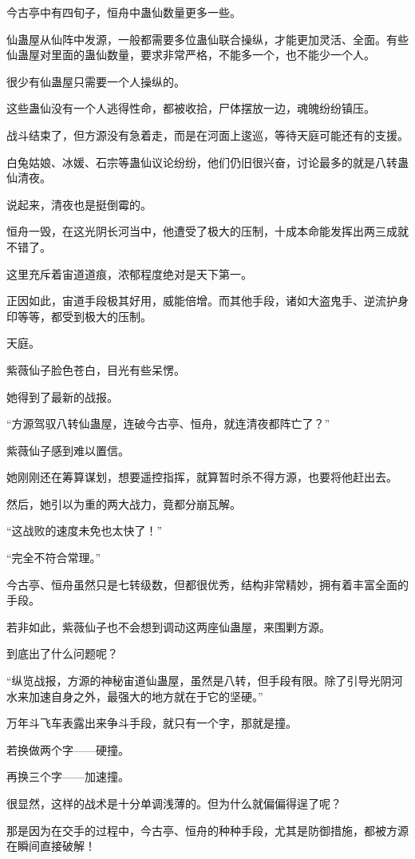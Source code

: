 \begin{this_body}
今古亭中有四旬子，恒舟中蛊仙数量更多一些。

仙蛊屋从仙阵中发源，一般都需要多位蛊仙联合操纵，才能更加灵活、全面。有些仙蛊屋对里面的蛊仙数量，要求非常严格，不能多一个，也不能少一个人。

很少有仙蛊屋只需要一个人操纵的。

这些蛊仙没有一个人逃得性命，都被收拾，尸体摆放一边，魂魄纷纷镇压。

战斗结束了，但方源没有急着走，而是在河面上逡巡，等待天庭可能还有的支援。

白兔姑娘、冰媛、石宗等蛊仙议论纷纷，他们仍旧很兴奋，讨论最多的就是八转蛊仙清夜。

说起来，清夜也是挺倒霉的。

恒舟一毁，在这光阴长河当中，他遭受了极大的压制，十成本命能发挥出两三成就不错了。

这里充斥着宙道道痕，浓郁程度绝对是天下第一。

正因如此，宙道手段极其好用，威能倍增。而其他手段，诸如大盗鬼手、逆流护身印等等，都受到极大的压制。

天庭。

紫薇仙子脸色苍白，目光有些呆愣。

她得到了最新的战报。

“方源驾驭八转仙蛊屋，连破今古亭、恒舟，就连清夜都阵亡了？”

紫薇仙子感到难以置信。

她刚刚还在筹算谋划，想要遥控指挥，就算暂时杀不得方源，也要将他赶出去。

然后，她引以为重的两大战力，竟都分崩瓦解。

“这战败的速度未免也太快了！”

“完全不符合常理。”

今古亭、恒舟虽然只是七转级数，但都很优秀，结构非常精妙，拥有着丰富全面的手段。

若非如此，紫薇仙子也不会想到调动这两座仙蛊屋，来围剿方源。

到底出了什么问题呢？

“纵览战报，方源的神秘宙道仙蛊屋，虽然是八转，但手段有限。除了引导光阴河水来加速自身之外，最强大的地方就在于它的坚硬。”

万年斗飞车表露出来争斗手段，就只有一个字，那就是撞。

若换做两个字——硬撞。

再换三个字——加速撞。

很显然，这样的战术是十分单调浅薄的。但为什么就偏偏得逞了呢？

那是因为在交手的过程中，今古亭、恒舟的种种手段，尤其是防御措施，都被方源在瞬间直接破解！


\end{this_body}
